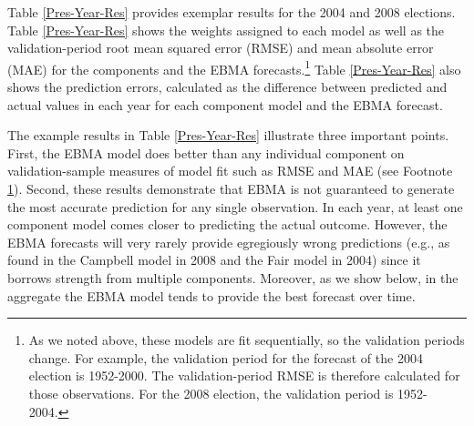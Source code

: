 \documentclass[12pt,fullpage,endnotes]{article}
\newcommand{\note}[1]{\footnote{ #1 \vspace{4 mm}}}
\begin{document}
 Table \ref{Pres-Year-Res} provides exemplar results for the 2004 and
 2008 elections.  Table \ref{Pres-Year-Res} shows the weights assigned
 to each model as well as the validation-period root mean squared
 error (RMSE) and mean absolute error (MAE) for the components and the
 EBMA forecasts.\note{As we noted above, these models are fit
   sequentially, so the validation periods change.  For example, the
   validation period for the forecast of the 2004 election is
   1952-2000.  The validation-period RMSE is therefore calculated for
   those observations.  For the 2008 election, the validation period
   is 1952-2004.\label{clarity}} Table \ref{Pres-Year-Res} also shows
 the prediction errors, calculated as the difference between predicted
 and actual values in each year for each component model and the EBMA
 forecast.

 The example results in Table \ref{Pres-Year-Res} illustrate three
 important points.  First, the EBMA model does better than any
 individual component on validation-sample measures of model fit such
 as RMSE and MAE (see Footnote \ref{clarity}).  Second, these results
 demonstrate that EBMA is not guaranteed to generate the most accurate
 prediction for any single observation.  In each year, at least one
 component model comes closer to predicting the actual outcome.
 However, the EBMA forecasts will very rarely provide egregiously
 wrong predictions (e.g., as found in the Campbell model in 2008 and
 the Fair model in 2004) since it borrows strength from multiple
 components.  Moreover, as we show below, in the aggregate the EBMA
 model tends to provide the best forecast over time.
\end{document}
